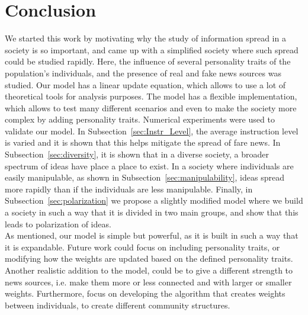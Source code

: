 \section{Conclusion}
We started this work by motivating why the study of information spread in a society is so important, and came up with a simplified society where such spread could be studied rapidly. Here, the influence of several personality traits of the population's individuals, and the presence of real and fake news sources was studied. Our model has a linear update equation, which allows to use a lot of theoretical tools for analysis purposes. The model has a flexible implementation, which allows to test many different scenarios and even to make the society more complex by adding personality traits.
Numerical experiments were used to validate our model. In Subsection~\ref{sec:Instr_Level}, the average instruction level is varied and it is shown that this helps mitigate the spread of fare news. In Subsection~\ref{sec:diversity}, it is shown that in a diverse society, a broader spectrum of ideas have place a place to exist. In a society where individuals are easily manipulable, as shown in Subsection~\ref{sec:manipulability}, ideas spread more rapidly than if the individuals are less manipulable.
Finally, in Subsection~\ref{sec:polarization} we propose a slightly modified model where we build a society in such a way that it is divided in two main groups, and show that this leads to polarization of ideas.\\
As mentioned, our model is simple but powerful, as it is built in such a way that it is expandable. Future work could focus on including personality traits, or modifying how the weights are updated based on the defined personality traits. Another realistic addition to the model, could be to give a different strength to news sources, i.e. make them more or less connected and with larger or smaller weights.
Furthermore, focus on developing the algorithm that creates weights between individuals, to create different community structures.
 